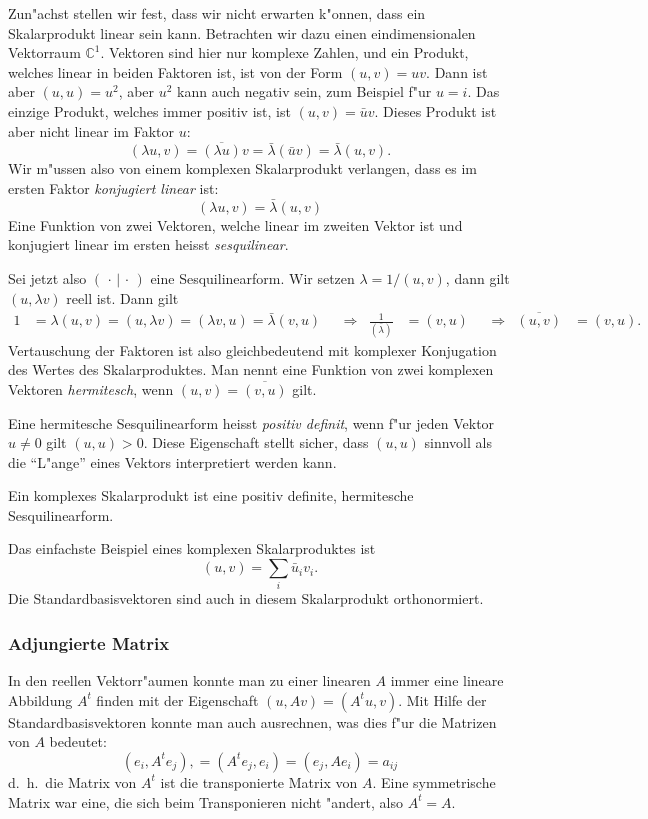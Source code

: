 Zun"achst stellen wir fest, dass wir nicht erwarten k"onnen, dass
ein Skalarprodukt linear sein kann.
Betrachten wir dazu einen eindimensionalen Vektorraum $\mathbb C^1$.
Vektoren sind hier nur komplexe Zahlen, und ein Produkt, welches
linear in beiden Faktoren ist, ist von der Form $(u,v)=uv$. Dann ist
aber $(u,u)=u^2$, aber $u^2$ kann auch negativ sein, zum Beispiel f"ur $u=i$.
Das einzige Produkt, welches immer positiv ist, ist $(u,v)=\bar uv$.
Dieses Produkt ist aber nicht linear im Faktor $u$:
\[
(\lambda u,v)=\overline{(\lambda u)}v=\bar\lambda (\bar uv)=\bar\lambda (u,v).
\]
Wir m"ussen also von einem komplexen Skalarprodukt verlangen, dass es
im ersten Faktor {\em konjugiert linear} ist:
\[
(\lambda u,v)=\bar\lambda(u,v)
\]
Eine Funktion von zwei Vektoren, welche linear im zweiten Vektor ist
und konjugiert linear im ersten heisst {\em sesquilinear}.

Sei jetzt also $(\,\cdot\,|\,\cdot\,)$ eine Sesquilinearform.
Wir setzen $\lambda = 1/(u,v)$, dann gilt
$(u,\lambda v)$ reell ist. Dann gilt
\begin{align*}
1&=\lambda (u,v)=(u,\lambda v)=(\lambda v,u)=\bar\lambda(v,u)
&
&\Rightarrow&
\frac1{(\bar\lambda)}&=(v,u)
&
&\Rightarrow&
\overline{(u,v)}&=(v,u).
\end{align*}
Vertauschung der Faktoren ist also gleichbedeutend mit komplexer Konjugation
des Wertes des Skalarproduktes. Man nennt eine Funktion von zwei komplexen
Vektoren {\em hermitesch}, wenn $(u,v)=\overline{(v,u)}$ gilt.

Eine hermitesche Sesquilinearform heisst {\em positiv definit}, wenn
f"ur jeden Vektor $u\ne 0$ gilt $(u,u)>0$. Diese Eigenschaft stellt
sicher, dass $(u,u)$ sinnvoll als die ``L"ange'' eines Vektors interpretiert
werden kann.

\begin{definition}
Ein komplexes Skalarprodukt ist eine positiv definite,
hermitesche Sesquilinearform.
\end{definition}

Das einfachste Beispiel eines komplexen Skalarproduktes ist
\[
(u,v)=\sum_i \bar u_iv_i.
\]
Die Standardbasisvektoren sind auch in diesem Skalarprodukt
orthonormiert.

%
%
\subsubsection{Adjungierte Matrix}
In den reellen Vektorr"aumen konnte man zu einer linearen $A$ immer
eine lineare Abbildung $A^t$ finden mit der Eigenschaft
$(u,Av)=(A^tu,v)$. Mit Hilfe der Standardbasisvektoren konnte
man auch ausrechnen, was dies f"ur die Matrizen von $A$ bedeutet:
\[
(e_i,A^te_j),
=
(A^te_j, e_i)
=
(e_j,Ae_i)=a_{ij}
\]
d.~h.~die Matrix von $A^t$ ist die transponierte Matrix von $A$.
Eine symmetrische Matrix war eine, die sich beim Transponieren nicht
"andert, also $A^t=A$.

